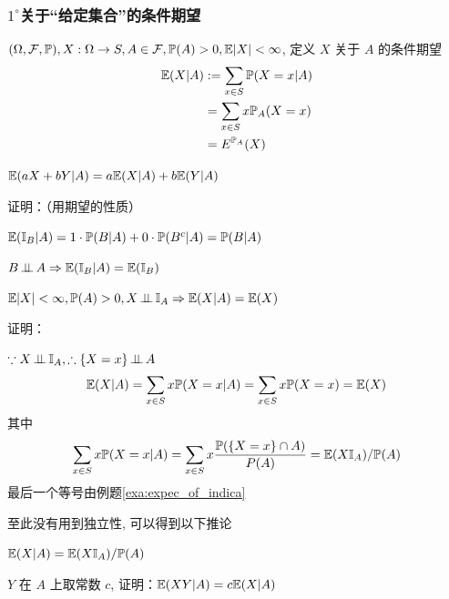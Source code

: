 \subsubsection*{$1^\circ$关于“给定集合”的条件期望}

\begin{definition}\label{def:set_con_exp}
    $(\Omega, \mathcal{F}, \mathbb{P}), X:\Omega\rightarrow S, A\in \mathcal{F}, \mathbb{P}(A)>0, \mathbb E|X|<\infty$, 定义 $X$ 关于 $A$ 的条件期望
    \[
    \begin{aligned}
        \mathbb E(X|A)&:=\sum_{x\in S}\mathbb{P}(X=x|A)\\
        &=\sum_{x\in S}x\mathbb{P}_A(X=x)\\
        &=E^{\mathbb{P}_A}(X)
    \end{aligned}
    \]
\end{definition}

\begin{property}[线性性]\label{prop:linearity1}
$\mathbb E(aX+bY|A)=a\mathbb E(X|A)+b\mathbb E(Y|A)$
\end{property}

证明：（用期望的性质）

\begin{example}
    $\mathbb E(\mathbb I_B|A)=1\cdot \mathbb{P}(B|A)+0\cdot \mathbb{P}(B^c|A)=\mathbb{P}(B|A)$
\end{example}

\begin{example}
    $B\operatorname{\perp\!\!\!\perp} A\Rightarrow \mathbb E(\mathbb I_B|A)=\mathbb E(\mathbb I_B)$
\end{example}

\begin{property}
$\mathbb E|X|<\infty, \mathbb{P}(A)>0, X\operatorname{\perp\!\!\!\perp} \mathbb I_A\Rightarrow \mathbb E(X|A)=\mathbb E(X)$
\end{property}

证明：

$\because X\operatorname{\perp\!\!\!\perp} \mathbb I_A, \therefore \{X=x\}\operatorname{\perp\!\!\!\perp} A$
\[
\mathbb E(X|A)=\sum_{x\in S}x\mathbb{P}(X=x|A)=\sum_{x\in S}x\mathbb{P}(X=x)=\mathbb E(X)
\]
其中
\[
\sum_{x\in S}x\mathbb{P}(X=x|A)=\sum_{x\in S}x\frac{\mathbb{P}(\{X=x\}\cap A)}{P(A)}=\mathbb E(X\mathbb I_A)/\mathbb{P}(A)
\]
最后一个等号由例题\ref{exa:expec_of_indica}

至此没有用到独立性, 可以得到以下推论

\begin{corollary}\label{cor:con_exp_indic}
    $\mathbb E(X|A)=\mathbb E(X\mathbb I_A)/\mathbb{P}(A)$
\end{corollary}

\begin{problem}[作业2-1]
$Y$ 在 $A$ 上取常数 $c$, 证明：$\mathbb E(XY|A)=c\mathbb E(X|A)$
\end{problem}

